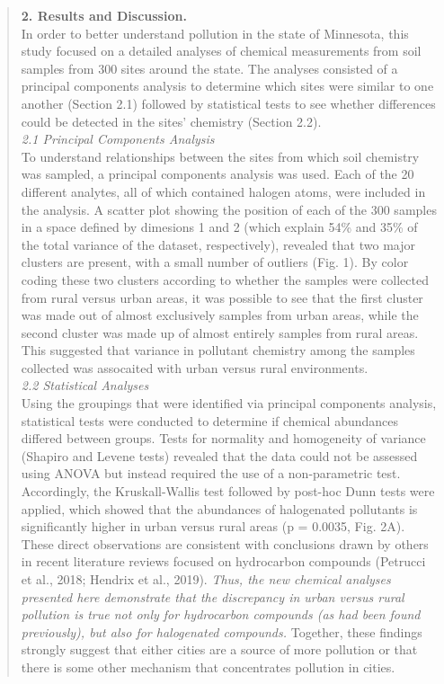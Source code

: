 \documentclass[
]{krantz}
\begin{document}
\begin{quote}
\textbf{2. Results and Discussion.}\\

In order to better understand pollution in the state of Minnesota, this study focused on a detailed analyses of chemical measurements from soil samples from 300 sites around the state. The analyses consisted of a principal components analysis to determine which sites were similar to one another (Section 2.1) followed by statistical tests to see whether differences could be detected in the sites' chemistry (Section 2.2).\\

\emph{2.1 Principal Components Analysis}\\

To understand relationships between the sites from which soil chemistry was sampled, a principal components analysis was used. Each of the 20 different analytes, all of which contained halogen atoms, were included in the analysis. A scatter plot showing the position of each of the 300 samples in a space defined by dimesions 1 and 2 (which explain 54\% and 35\% of the total variance of the dataset, respectively), revealed that two major clusters are present, with a small number of outliers (Fig. 1). By color coding these two clusters according to whether the samples were collected from rural versus urban areas, it was possible to see that the first cluster was made out of almost exclusively samples from urban areas, while the second cluster was made up of almost entirely samples from rural areas. This suggested that variance in pollutant chemistry among the samples collected was assocaited with urban versus rural environments.\\

\emph{2.2 Statistical Analyses}\\

Using the groupings that were identified via principal components analysis, statistical tests were conducted to determine if chemical abundances differed between groups. Tests for normality and homogeneity of variance (Shapiro and Levene tests) revealed that the data could not be assessed using ANOVA but instead required the use of a non-parametric test. Accordingly, the Kruskall-Wallis test followed by post-hoc Dunn tests were applied, which showed that the abundances of halogenated pollutants is significantly higher in urban versus rural areas (p = 0.0035, Fig. 2A). These direct observations are consistent with conclusions drawn by others in recent literature reviews focused on hydrocarbon compounds (Petrucci et al., 2018; Hendrix et al., 2019). \emph{Thus, the new chemical analyses presented here demonstrate that the discrepancy in urban versus rural pollution is true not only for hydrocarbon compounds (as had been found previously), but also for halogenated compounds.} Together, these findings strongly suggest that either cities are a source of more pollution or that there is some other mechanism that concentrates pollution in cities.\\
\end{quote}
\end{document}
